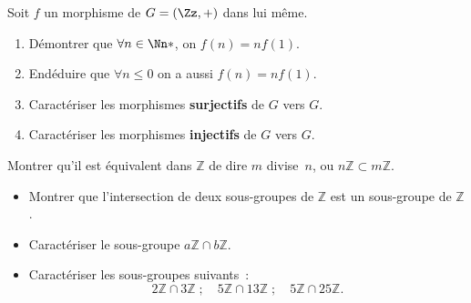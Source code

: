 \documentclass[10pt, a4paper, twocolumn]{homework}
\begin{document}

Soit $f$ un morphisme de $ G = \left(\Zz, +\right)$ dans lui même.
\begin{enumerate}
  \item Démontrer que $\forall n \in \Nn*$, on $f(n)= nf(1)$.
  \item Endéduire que $\forall n\leq 0$ on a aussi $f(n) = nf(1)$. 
  \item Caractériser les morphismes \textbf{surjectifs} de $G$ vers $G$.
  \item Caractériser les morphismes \textbf{injectifs} de $G$ vers $G$.
\end{enumerate}


Montrer qu'il est équivalent dans $\mathbb{Z}$ de dire $m$ divise~$n$, ou
$n\mathbb{Z}\subset m\mathbb{Z}$.

\begin{itemize}
 \item Montrer que l'intersection de deux sous-groupes de $\mathbb{Z}$ est un
sous-groupe de $\mathbb{Z}$. 
\item Caractériser le sous-groupe  $a \mathbb{Z}\cap b \mathbb{Z}$.
\item Caractériser les sous-groupes suivants~: 
$$2\mathbb{Z}\cap 3\mathbb{Z}\;; \quad 5 \mathbb{Z}\cap 13\mathbb{Z}\;; 
    \quad 5 \mathbb{Z}\cap 25\mathbb{Z}.$$
\end{itemize}
\end{document}
